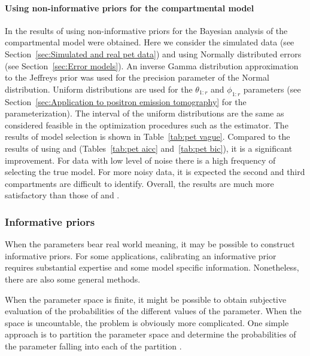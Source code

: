 \paragraph{Using non-informative priors for the \pet compartmental model}

In \cite{Zhou2013} the results of using non-informative priors for the
Bayesian analysis of the \pet compartmental model were obtained. Here we
consider the simulated data (see Section~\ref{sec:Simulated and real pet
data}) and using Normally distributed errors (see Section~\ref{sec:Error
models}). An inverse Gamma distribution approximation to the Jeffreys prior
was used for the precision parameter of the Normal distribution. Uniform
distributions are used for the $\theta_{1:r}$ and $\phi_{1:r}$ parameters
(see Section~\ref{sec:Application to positron emission tomography} for the
parameterization). The interval of the uniform distributions are the same as
considered feasible in the optimization procedures such as the \nls
estimator. The results of model selection is shown in Table~\ref{tab:pet
vague}. Compared to the results of using \aicc and \bic (Tables~\ref{tab:pet
aicc} and~\ref{tab:pet bic}), it is a significant improvement. For data with
low level of noise there is a high frequency of selecting the true model. For
more noisy data, it is expected the second and third compartments are
difficult to identify. Overall, the results are much more satisfactory than
those of \aicc and \bic.



\subsubsection{Informative priors}
\label{ssub:Informative priors}

When the parameters bear real world meaning, it may be possible to construct
informative priors. For some applications, calibrating an informative prior
requires substantial expertise and some model specific information.
Nonetheless, there are also some general methods.

When the parameter space is finite, it might be possible to obtain subjective
evaluation of the probabilities of the different values of the parameter.
When the space is uncountable, the problem is obviously more complicated. One
simple approach is to partition the parameter space and determine the
probabilities of the parameter falling into each of the partition
\cite[][sec.~3.2.2]{Robert:2007tc}.

